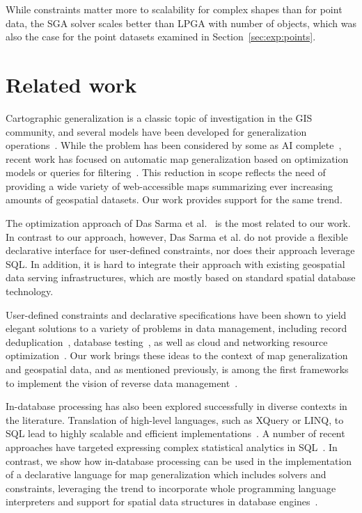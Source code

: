 \documentclass[11pt, oneside]{report}
\begin{document}
While constraints matter more to scalability for complex shapes than for point data, the SGA solver scales better than LPGA with number of objects, which was also the case for the point datasets examined in Section~\ref{sec:exp:points}.

\section{Related work}
\label{sec:cvl:related:work}

Cartographic generalization is a classic topic of investigation in the GIS community, and several models have been developed for generalization operations~\cite{harrie2007modelling}. While the problem has been considered by some as AI complete~\cite{frank1994multiscaletree}, recent work has focused on automatic map generalization based on optimization models or queries for filtering~\cite{sarma2012fusiontables,nutanong2012multiresolution}. This reduction in scope reflects the need of providing a wide variety of web-accessible maps summarizing ever increasing amounts of geospatial datasets. Our work provides support for the same trend.  

The optimization approach of Das Sarma et al.~\cite{sarma2012fusiontables} is the most related to our work. In contrast to our approach, however, Das Sarma et al. do not provide a flexible declarative interface for user-defined constraints, nor does their approach leverage SQL. 
In addition, it is hard to integrate their approach with existing geospatial data serving infrastructures, which are mostly based on standard spatial database technology.

User-defined constraints and declarative specifications have been shown to yield elegant solutions to a variety of problems in data management, including record deduplication~\cite{ArasuRS09:Dedupalog}, database testing~\cite{BinnigKL07:ReverseQP,Binnig:2007:SymbolicQP}, as well as cloud and networking resource optimization~\cite{Liu:2012:Cologne}. Our work brings these ideas to the context of map generalization and geospatial data, and as mentioned previously, is among the first frameworks to implement the vision of reverse data management~\cite{meliou2011reverse}. 

In-database processing has also been explored successfully in diverse contexts in the literature. Translation of high-level languages, such as XQuery or LINQ, to SQL lead to highly scalable and efficient implementations~\cite{pathfinder,ferry}. A number of recent approaches have targeted expressing complex statistical analytics in SQL~\cite{Hellerstein:2012:Madlib,Ordonez2007:StatisticsUDFs}. In contrast, we show how in-database processing can be used in the implementation of a declarative language for map generalization which includes solvers and constraints, leveraging the trend to incorporate whole programming language interpreters and support for spatial data structures in database engines~\cite{Blakeley2008:DotNET}.  
\end{document}
